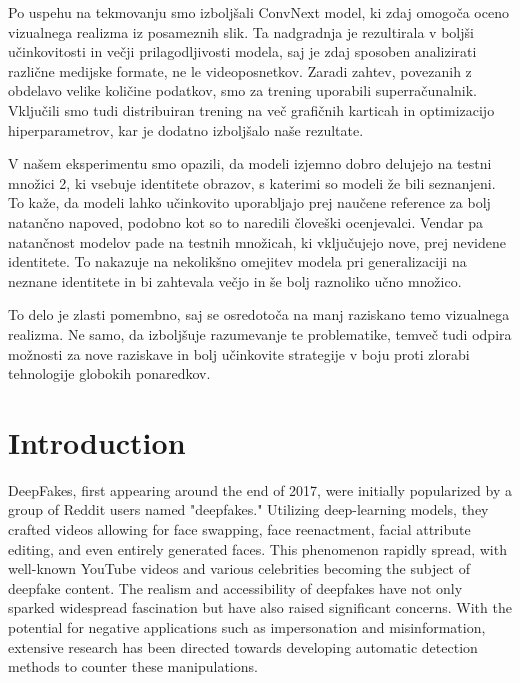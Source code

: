 \documentclass[a4paper,12pt,openright]{book}
\newcommand{\clearemptydoublepage}{\newpage{\pagestyle{empty}\cleardoublepage}}
\begin{document}
Po uspehu na tekmovanju smo izboljšali ConvNext model, ki zdaj omogoča oceno vizualnega realizma iz posameznih slik. Ta nadgradnja je rezultirala v boljši učinkovitosti in večji prilagodljivosti modela, saj je zdaj sposoben analizirati različne medijske formate, ne le videoposnetkov. 
Zaradi zahtev, povezanih z obdelavo velike količine podatkov, smo za trening uporabili superračunalnik. Vključili smo tudi distribuiran trening na več grafičnih karticah in optimizacijo hiperparametrov, kar je dodatno izboljšalo naše rezultate. 

V našem eksperimentu smo opazili, da modeli izjemno dobro delujejo na testni množici 2, ki vsebuje identitete obrazov, s katerimi so modeli že bili seznanjeni. To kaže, da modeli lahko učinkovito uporabljajo prej naučene reference za bolj natančno napoved, podobno kot so to naredili človeški ocenjevalci.
Vendar pa natančnost modelov pade na testnih množicah, ki vključujejo nove, prej nevidene identitete. To nakazuje na nekolikšno omejitev modela pri generalizaciji na neznane identitete in bi zahtevala večjo in še bolj raznoliko učno množico.

To delo je zlasti pomembno, saj se osredotoča na manj raziskano temo vizualnega realizma. Ne samo, da izboljšuje razumevanje te problematike, temveč tudi odpira možnosti za nove raziskave in bolj učinkovite strategije v boju proti zlorabi tehnologije globokih ponaredkov.


\bigskip

\clearemptydoublepage


\mainmatter
\setcounter{page}{1}
\pagestyle{fancy}

\chapter{Introduction}
\label{chap:introduction}
DeepFakes, first appearing around the end of 2017, were initially popularized by a group of Reddit users named "deepfakes." Utilizing deep-learning models, they crafted videos allowing for face swapping, face reenactment, facial attribute editing, and even entirely generated faces. This phenomenon rapidly spread, with well-known YouTube videos and various celebrities becoming the subject of deepfake content. The realism and accessibility of deepfakes have not only sparked widespread fascination but have also raised significant concerns. With the potential for negative applications such as impersonation and misinformation, extensive research has been directed towards developing automatic detection methods to counter these manipulations.
\end{document}
